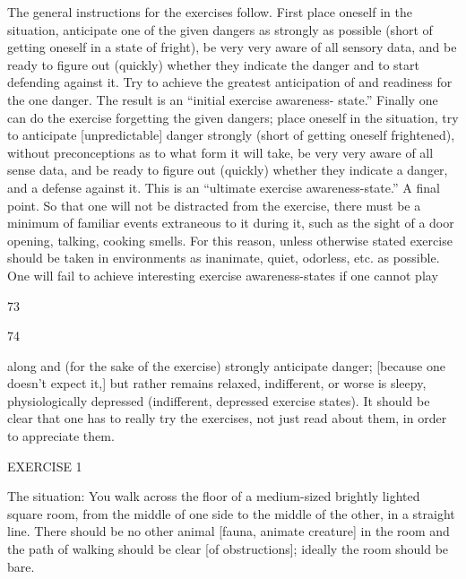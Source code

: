 The general instructions for the exercises follow. First place oneself in the 
situation, anticipate one of the given dangers as strongly as possible (short 
of getting oneself in a state of fright), be very very aware of all sensory data, 
and be ready to figure out (quickly) whether they indicate the danger and to 
start defending against it. Try to achieve the greatest anticipation of and 
readiness for the one danger. The result is an “initial exercise awareness- 
state.” Finally one can do the exercise forgetting the given dangers; place 
oneself in the situation, try to anticipate [unpredictable] danger strongly 
(short of getting oneself frightened), without preconceptions as to what form 
it will take, be very very aware of all sense data, and be ready to figure out 
(quickly) whether they indicate a danger, and a defense against it. This is 
an “ultimate exercise awareness-state.” A final point. So that one will not be 
distracted from the exercise, there must be a minimum of familiar events 
extraneous to it during it, such as the sight of a door opening, talking, 
cooking smells. For this reason, unless otherwise stated exercise should be 
taken in environments as inanimate, quiet, odorless, etc. as possible. One 
will fail to achieve interesting exercise awareness-states if one cannot play 


73 


74 


along and (for the sake of the exercise) strongly anticipate danger; [because 
one doesn’t expect it,] but rather remains relaxed, indifferent, or worse is 
sleepy, physiologically depressed (indifferent, depressed exercise states). 
It should be clear that one has to really try the exercises, not just read about 
them, in order to appreciate them. 


EXERCISE 1 

The situation: You walk across the floor of a medium-sized brightly lighted 
square room, from the middle of one side to the middle of the other, in a 
straight line. There should be no other animal [fauna, animate creature] in 
the room and the path of walking should be clear [of obstructions]; ideally 
the room should be bare. 

